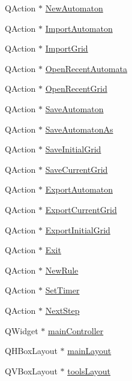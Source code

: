 \begin{DoxyCompactItemize}
\item 
Q\+Action $\ast$ \mbox{\hyperlink{class_main_controller_aa4e27060ff692d2e336d89534d437ec5}{New\+Automaton}}
\item 
Q\+Action $\ast$ \mbox{\hyperlink{class_main_controller_aa0379ddfda571ec99218a2fb0a1b205c}{Import\+Automaton}}
\item 
Q\+Action $\ast$ \mbox{\hyperlink{class_main_controller_a5457e18d4c2df72f7c5684d7ead37346}{Import\+Grid}}
\item 
Q\+Action $\ast$ \mbox{\hyperlink{class_main_controller_acf34814052183a7b16b799073b0f7d42}{Open\+Recent\+Automata}}
\item 
Q\+Action $\ast$ \mbox{\hyperlink{class_main_controller_a88ac3d205cf726f1d354a1944cfccfa0}{Open\+Recent\+Grid}}
\item 
Q\+Action $\ast$ \mbox{\hyperlink{class_main_controller_aea174540239231764b8abdfc7d62b900}{Save\+Automaton}}
\item 
Q\+Action $\ast$ \mbox{\hyperlink{class_main_controller_a4a10844a4ef8fa3ea5918f881d39da17}{Save\+Automaton\+As}}
\item 
Q\+Action $\ast$ \mbox{\hyperlink{class_main_controller_ad0e894d761ecd9367868ea39694a9e33}{Save\+Initial\+Grid}}
\item 
Q\+Action $\ast$ \mbox{\hyperlink{class_main_controller_abe302a428893230967ead1c5612a2c10}{Save\+Current\+Grid}}
\item 
Q\+Action $\ast$ \mbox{\hyperlink{class_main_controller_abfbbaa5a2ca58e3c3eb23c7ec2512273}{Export\+Automaton}}
\item 
Q\+Action $\ast$ \mbox{\hyperlink{class_main_controller_ac4da878595e3190049a7fee30f360537}{Export\+Current\+Grid}}
\item 
Q\+Action $\ast$ \mbox{\hyperlink{class_main_controller_ae348be948bfabf7f1756792d85d2c3a7}{Export\+Initial\+Grid}}
\item 
Q\+Action $\ast$ \mbox{\hyperlink{class_main_controller_a5db737ac032ba58ba169a7ecf95c1a56}{Exit}}
\item 
Q\+Action $\ast$ \mbox{\hyperlink{class_main_controller_af37c04bcfa78a77f2e7d717a5afa89e1}{New\+Rule}}
\item 
Q\+Action $\ast$ \mbox{\hyperlink{class_main_controller_a6bf8a7e4bd6677520dd6dcbd6659f5f3}{Set\+Timer}}
\item 
Q\+Action $\ast$ \mbox{\hyperlink{class_main_controller_a1ac3369371a9809fb9a20bbe138c220c}{Next\+Step}}
\item 
Q\+Widget $\ast$ \mbox{\hyperlink{class_main_controller_a2a3c3891d166eb53dff1422783687c18}{main\+Controller}}
\item 
Q\+H\+Box\+Layout $\ast$ \mbox{\hyperlink{class_main_controller_a21f032f82ef8e0679f60415185697c90}{main\+Layout}}
\item 
Q\+V\+Box\+Layout $\ast$ \mbox{\hyperlink{class_main_controller_a20c2cdd1c4ec1dda449df88f9d491696}{tools\+Layout}}
\end{DoxyCompactItemize}


